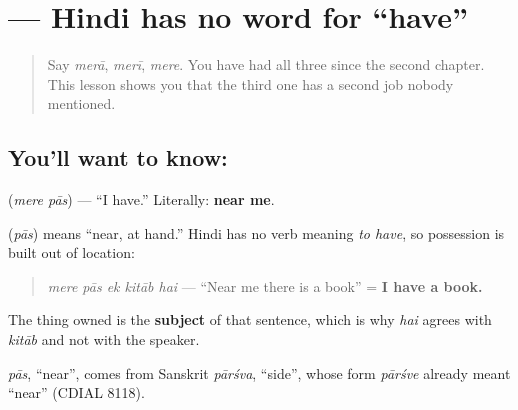 \section[\texorpdfstring{\hi{मेरे} \hi{पास} (mere pās)}{मेरे पास (mere pās)}]{  — Hindi has no word for \textquotedblleft{}have\textquotedblright{}}

\label{lesson:HI-C84-mere-paas}



\begin{quote}
Say \emph{merā}, \emph{merī}, \emph{mere}. You have had all three since the second chapter. This lesson shows you that the third one has a second job nobody mentioned.
\end{quote}

\subsection*{You'll want to know:  }
\textbf{ } (\emph{mere pās}) — \textquotedblleft{}I have.\textquotedblright{} Literally: \textbf{near me}.

\textbf{} (\emph{pās}) means \textquotedblleft{}near, at hand.\textquotedblright{} Hindi has no verb meaning \emph{to have}, so possession is built out of location:

\begin{quote}
     \emph{mere pās ek kitāb hai} — \textquotedblleft{}Near me there is a book\textquotedblright{} = \textbf{I have a book.}
\end{quote}

The thing owned is the \textbf{subject} of that sentence, which is why \emph{hai} agrees with \emph{kitāb} and not with the speaker.

\begin{cousinweb}
\emph{pās}, \textquotedblleft{}near\textquotedblright{}, comes from Sanskrit \emph{pārśva}, \textquotedblleft{}side\textquotedblright{}, whose form \emph{pārśve} already meant \textquotedblleft{}near\textquotedblright{} (CDIAL 8118).
\end{cousinweb}

